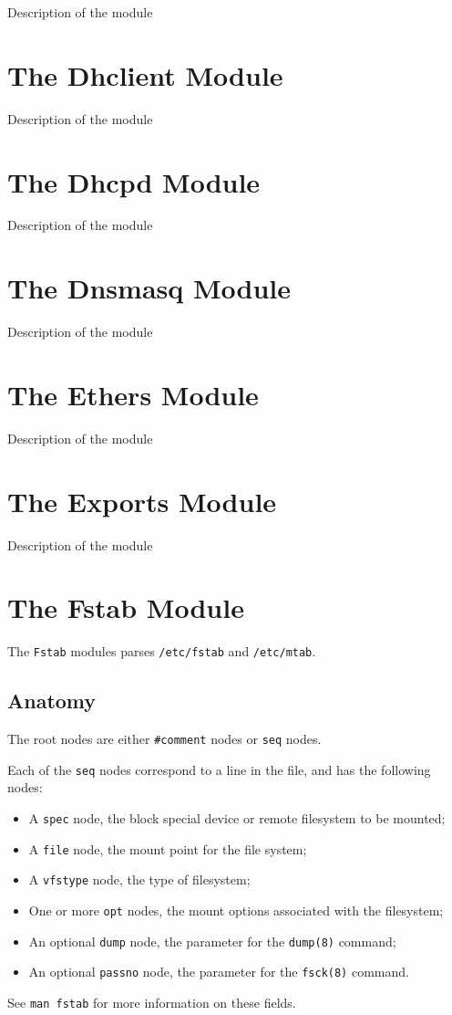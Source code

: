 Description of the module

\section{The Dhclient Module}

Description of the module

\section{The Dhcpd Module}

Description of the module

\section{The Dnsmasq Module}

Description of the module

\section{The Ethers Module}

Description of the module

\section{The Exports Module}

Description of the module

\section{The Fstab Module}

The \verb!Fstab! modules parses \nolinkurl{/etc/fstab} and \nolinkurl{/etc/mtab}.

\subsection{Anatomy}

The root nodes are either \verb!#comment! nodes or \verb!seq! nodes.

Each of the \verb!seq! nodes correspond to a line in the file, and has the following nodes:

\begin{itemize}
\item
  A \verb!spec! node, the block special device or remote filesystem to be mounted;
\item
  A \verb!file! node, the mount point for the file system;
\item
  A \verb!vfstype! node, the type of filesystem;
\item
  One or more \verb!opt! nodes, the mount options associated with the filesystem;
\item
  An optional \verb!dump! node, the parameter for the \verb!dump(8)! command;
\item
  An optional \verb!passno! node, the parameter for the \verb!fsck(8)! command.
\end{itemize}
See \verb!man fstab! for more information on these fields.

